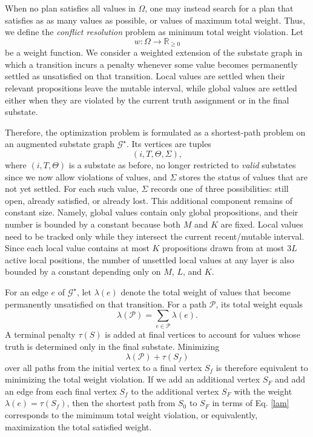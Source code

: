 \documentclass[]{jair}
\begin{document}
When no plan satisfies all values in $\Omega$, one may instead search for a plan that satisfies as
as many values as possible, or values of maximum total weight. Thus, we define
the {\it conflict resolution} problem as minimum total weight violation. Let
\[
w:\Omega \to \mathbb{R}_{\geq 0}
\]
be a weight function. We consider a weighted extension of the substate graph in which a
transition incurs a penalty whenever some value becomes permanently settled as unsatisfied on that
transition. Local values are settled when their relevant propositions leave the mutable interval,
while global values are settled either when they are violated by the current truth assignment or in the final substate.

Therefore, the optimization problem is formulated as a shortest-path problem
on an augmented substate graph $\mathcal{G}^{\star}$. Its vertices are tuples
\[
(i,T,\Theta,\Sigma),
\]
where $(i,T,\Theta)$ is a substate as before, no longer restricted to {\it valid} substates since we now allow violations of values, and $\Sigma$ stores the status of values that are not yet settled. For each such value, $\Sigma$ records one of three possibilities: still open, already satisfied, or already lost. This additional component remains of constant size. Namely, global values contain only global propositions, and their number is bounded by a constant because both $M$ and $K$ are fixed. Local values need to be tracked only while they intersect the current recent/mutable interval. Since each local value contains at most $K$ propositions drawn from at most $3L$ active local positions, the number of unsettled local values at any layer is also bounded by a constant depending only on $M$, $L$, and $K$.

For an edge $e$ of $\mathcal{G}^{\star}$, let $\lambda(e)$ denote the total weight of values that become
permanently unsatisfied on that transition. For a path $\mathcal{P}$, its total weight equals
\begin{equation}\label{lam}
\lambda(\mathcal{P})=\sum_{e\in \mathcal{P}} \lambda(e).
\end{equation}
A terminal penalty $\tau(S)$ is added at final vertices to account for values whose truth
is determined only in the final substate. Minimizing
\[
\lambda(\mathcal{P})+\tau(S_f)
\]
over all paths from the initial vertex to a final vertex $S_f$ is therefore equivalent to
minimizing the total weight violation. If we add an additional vertex $S_F$ and add an edge from each final vertex $S_f$ to
the additional vertex $S_F$ with the weight $\lambda(e)=\tau(S_f)$, then the shortest path from $S_0$ to $S_F$ in terms of
Eq. \eqref{lam} corresponds to the mimimum total weight violation, or equivalently, maximization the total satisfied weight.
\end{document}
